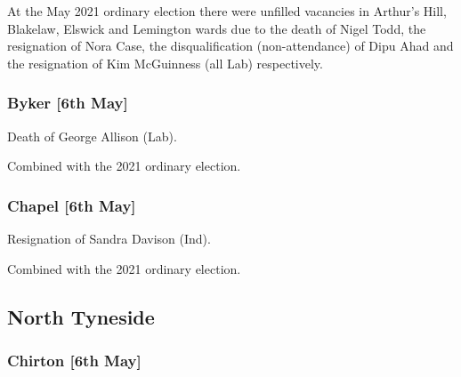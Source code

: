 \documentclass[a4paper,openany]{book}
\begin{document}
\begin{resultsiii}
At the May 2021 ordinary election there were unfilled vacancies in Arthur's Hill, Blakelaw, Elswick and Lemington wards due to the death of Nigel Todd, the resignation of Nora Case, the disqualification (non-attendance) of Dipu Ahad and the resignation of Kim McGuinness (all Lab) respectively.

\subsubsection*{Byker \hspace*{\fill}\nolinebreak[1]%
	\enspace\hspace*{\fill}
	[6th May]}


Death of George Allison (Lab).

Combined with the 2021 ordinary election.

\subsubsection*{Chapel \hspace*{\fill}\nolinebreak[1]%
	\enspace\hspace*{\fill}
	[6th May]}


Resignation of Sandra Davison (Ind).

Combined with the 2021 ordinary election.

\subsection*{North Tyneside}

\subsubsection*{Chirton \hspace*{\fill}\nolinebreak[1]%
	\enspace\hspace*{\fill}
	[6th May]}


\end{resultsiii}
\end{document}

